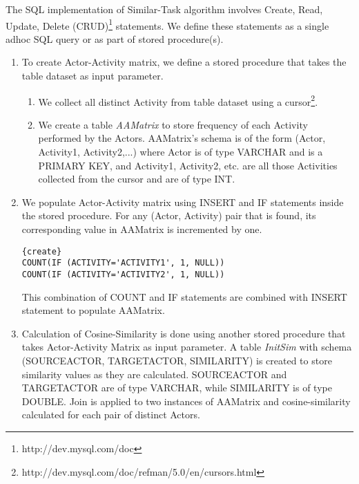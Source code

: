 \documentclass[11pt]{article}
\begin{document}
\par{The SQL implementation of Similar-Task algorithm involves Create, Read, Update, Delete (CRUD)\footnote{http://dev.mysql.com/doc} statements. We define these statements as a single adhoc SQL query or as part of stored procedure(s).
\begin{enumerate}[nolistsep]
\item To create Actor-Activity matrix, we define a stored procedure that takes the table dataset as input parameter. 
    \begin{enumerate}
    \item We collect all distinct Activity from table dataset using a cursor\footnote{http://dev.mysql.com/doc/refman/5.0/en/cursors.html}.
    \item We create a table \textit{AAMatrix} to store frequency of each Activity performed by the Actors. AAMatrix's schema is of the form (Actor, Activity1, Activity2,...) where Actor is of type VARCHAR and is a PRIMARY KEY, and Activity1, Activity2, etc. are all those Activities collected from the cursor and are of type INT.
    \end{enumerate}
\item We populate Actor-Activity matrix using INSERT and IF statements inside the stored procedure. For any (Actor, Activity) pair that is found, its corresponding value in AAMatrix is incremented by one.
\lstset{language=SQL} 
\begin{lstlisting}{create}
COUNT(IF (ACTIVITY='ACTIVITY1', 1, NULL))
COUNT(IF (ACTIVITY='ACTIVITY2', 1, NULL))
\end{lstlisting}
This combination of COUNT and IF statements are combined with INSERT statement to populate AAMatrix.
\item Calculation of Cosine-Similarity is done using another stored procedure that takes Actor-Activity Matrix as input parameter. A table \textit{InitSim} with schema (SOURCEACTOR, TARGETACTOR, SIMILARITY) is created to store similarity values as they are calculated. SOURCEACTOR and TARGETACTOR are of type VARCHAR, while SIMILARITY is of type DOUBLE. Join is applied to two instances of AAMatrix and cosine-similarity calculated for each pair of distinct Actors.

\end{enumerate}}
\end{document}
